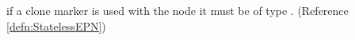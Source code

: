 if a clone marker is used  with the  node it must be of type .
  (Reference \ref{defn:StatelessEPN})